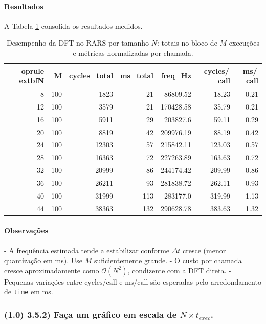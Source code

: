 \documentclass[12pt,a4paper]{article}
\begin{document}

\paragraph{Resultados}
A Tabela \ref{tab:bench_dft} consolida os resultados medidos.

\begin{table}[H]
\centering
\small
\begin{tabular}{@{}r r r r r r r@{}}
    oprule
    extbf{N} & \textbf{M} & \textbf{cycles\_total} & \textbf{ms\_total} & \textbf{freq\_Hz} & \textbf{cycles/\,call} & \textbf{ms/\,call} \\
\midrule
8 & 100 & 1823 & 21 & 86809.52 & 18.23 & 0.21 \\
12 & 100 & 3579 & 21 & 170428.58 & 35.79 & 0.21 \\
16 & 100 & 5911 & 29 & 203827.6 & 59.11 & 0.29 \\
20 & 100 & 8819 & 42 & 209976.19 & 88.19 & 0.42 \\
24 & 100 & 12303 & 57 & 215842.11 & 123.03 & 0.57 \\
28 & 100 & 16363 & 72 & 227263.89 & 163.63 & 0.72 \\
32 & 100 & 20999 & 86 & 244174.42 & 209.99 & 0.86 \\
36 & 100 & 26211 & 93 & 281838.72 & 262.11 & 0.93 \\
40 & 100 & 31999 & 113 & 283177.0 & 319.99 & 1.13 \\
44 & 100 & 38363 & 132 & 290628.78 & 383.63 & 1.32 \\
\bottomrule
\end{tabular}
\caption{Desempenho da DFT no RARS por tamanho \(N\): totais no bloco de \(M\) execuções e métricas normalizadas por chamada.}
\label{tab:bench_dft}
\end{table}

\paragraph{Observações}
- A frequência estimada tende a estabilizar conforme \(\Delta\!t\) cresce (menor quantização em ms). Use \(M\) suficientemente grande.
- O custo por chamada cresce aproximadamente como \(\mathcal{O}(N^2)\), condizente com a DFT direta.
- Pequenas variações entre \(\text{cycles}/\text{call}\) e \(\text{ms}/\text{call}\) são esperadas pelo arredondamento de \texttt{time} em ms.
\subsubsection*{(1.0) 3.5.2) Faça um gráfico em escala de $N \times t_{exec}$.}
\end{document}
